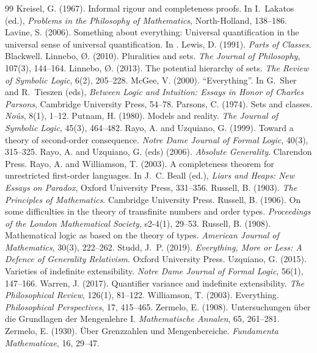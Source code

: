 \documentclass{situationist-preprint}
\begin{document}
\begin{thebibliography}{99}
 Kreisel, G. (1967). Informal rigour and completeness proofs. In I.~Lakatos (ed.), \emph{Problems in the Philosophy of Mathematics}, North-Holland, 138--186.
 Lavine, S. (2006). Something about everything: Universal quantification in the universal sense of universal quantification. In \citet{RayoUzquiano2006}.
 Lewis, D. (1991). \emph{Parts of Classes}. Blackwell.
 Linnebo, {\O}. (2010). Pluralities and sets. \emph{The Journal of Philosophy}, 107(3), 144--164.
 Linnebo, {\O}. (2013). The potential hierarchy of sets. \emph{The Review of Symbolic Logic}, 6(2), 205--228.
 McGee, V. (2000). \enquote{Everything}. In G.~Sher and R.~Tieszen (eds), \emph{Between Logic and Intuition: Essays in Honor of Charles Parsons}, Cambridge University Press, 54--78.
 Parsons, C. (1974). Sets and classes. \emph{No\^us}, 8(1), 1--12.
 Putnam, H. (1980). Models and reality. \emph{The Journal of Symbolic Logic}, 45(3), 464--482.
 Rayo, A. and Uzquiano, G. (1999). Toward a theory of second-order consequence. \emph{Notre Dame Journal of Formal Logic}, 40(3), 315--325.
 Rayo, A. and Uzquiano, G. (eds) (2006). \emph{Absolute Generality}. Clarendon Press.
 Rayo, A. and Williamson, T. (2003). A completeness theorem for unrestricted first-order languages. In J.~C. Beall (ed.), \emph{Liars and Heaps: New Essays on Paradox}, Oxford University Press, 331--356.
 Russell, B. (1903). \emph{The Principles of Mathematics}. Cambridge University Press.
 Russell, B. (1906). On some difficulties in the theory of transfinite numbers and order types. \emph{Proceedings of the London Mathematical Society}, s2-4(1), 29--53.
 Russell, B. (1908). Mathematical logic as based on the theory of types. \emph{American Journal of Mathematics}, 30(3), 222--262.
 Studd, J.~P. (2019). \emph{Everything, More or Less: A Defence of Generality Relativism}. Oxford University Press.
 Uzquiano, G. (2015). Varieties of indefinite extensibility. \emph{Notre Dame Journal of Formal Logic}, 56(1), 147--166.
 Warren, J. (2017). Quantifier variance and indefinite extensibility. \emph{The Philosophical Review}, 126(1), 81--122.
 Williamson, T. (2003). Everything. \emph{Philosophical Perspectives}, 17, 415--465.
 Zermelo, E. (1908). Untersuchungen \"uber die Grundlagen der Mengenlehre I. \emph{Mathematische Annalen}, 65, 261--281.
 Zermelo, E. (1930). \"Uber Grenzzahlen und Mengenbereiche. \emph{Fundamenta Mathematicae}, 16, 29--47.
\end{thebibliography}
\end{document}
